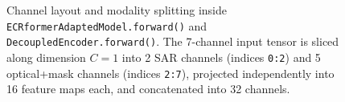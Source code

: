 \begin{figure}[htbp]
\caption{Channel layout and modality splitting inside \texttt{ECRformerAdaptedModel.forward()} and \texttt{DecoupledEncoder.forward()}. The 7-channel input tensor is sliced along dimension $C=1$ into 2 SAR channels (indices \texttt{0:2}) and 5 optical+mask channels (indices \texttt{2:7}), projected independently into 16 feature maps each, and concatenated into 32 channels.}
\label{fig:tensor_layout}
\end{figure}
